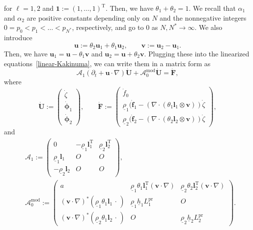 \documentclass[11pt,leqno]{article}
\numberwithin{equation}{section}
\numberwithin{figure}{section}
\begin{document}
%
for $\ell=1,2$ and $\bm{1}:=(1,\ldots,1)^\mathrm{T}$. 
Then, we have $\theta_1+\theta_2=1$.
We recall that $\alpha_1$ and $\alpha_2$ are positive constants depending only on $N$ and the nonnegative integers $0=p_0<p_1<\ldots<p_{N^*}$, respectively, 
and go to $0$ as $N,N^*\to\infty$. 
We also introduce 
%
\[
\bm{u} := \theta_2\bm{u}_1+\theta_1\bm{u}_2, \qquad \bm{v}:=\bm{u}_2-\bm{u}_1.
\]
%
Then, we have $\bm{u}_1=\bm{u}-\theta_1\bm{v}$ and $\bm{u}_2=\bm{u}+\theta_2\bm{v}$. 
Plugging these into the linearized equations~\eqref{linear-Kakinuma}, 
we can write them in a matrix form as 
%
\begin{equation}\label{Kakinuma-MF}
\mathscr{A}_1(\partial_t+\bm{u}\cdot\nabla)\dot{\bm{U}} + \mathscr{A}_0^\mathrm{mod}\dot{\bm{U}} = \dot{\bm{F}},
\end{equation}
%
where 
%
\[
\dot{\bm{U}} := \begin{pmatrix} \dot{\zeta} \\ \dot{\bm{\phi}}_1 \\ \dot{\bm{\phi}}_2 \end{pmatrix}, \qquad
\dot{\bm{F}} := \begin{pmatrix} \dot{f}_0 \\
 \underline{\rho}_1(\dot{\bm{f}}_1-(\nabla\cdot(\theta_1\bm{l}_1\otimes\bm{v}))\dot{\zeta} \\
 \underline{\rho}_2(\dot{\bm{f}}_2-(\nabla\cdot(\theta_2\bm{l}_2\otimes\bm{v}))\dot{\zeta} \end{pmatrix}, 
\]
%
and 
%
\begin{align*}
& \mathscr{A}_1 := 
\begin{pmatrix}
 0 & -\underline{\rho}_1\bm{l}_1^\mathrm{T} & \underline{\rho}_2\bm{l}_2^\mathrm{T} \\
 \underline{\rho}_1\bm{l}_1 & O & O \\
 -\underline{\rho}_2\bm{l}_2 & O & O
\end{pmatrix}, \\
& \mathscr{A}_0^\mathrm{mod} := 
\begin{pmatrix}
 a & \underline{\rho}_1\theta_1\bm{l}_1^\mathrm{T}(\bm{v}\cdot\nabla) 
  & \underline{\rho}_2\theta_2\bm{l}_2^\mathrm{T}(\bm{v}\cdot\nabla) \\
 (\bm{v}\cdot\nabla)^*(\underline{\rho}_1\theta_1\bm{l}_1\,\cdot\,) 
  & \underline{\rho}_1\underline{h}_1L_1^\mathrm{pr} & O \\
 (\bm{v}\cdot\nabla)^*(\underline{\rho}_2\theta_1\bm{l}_2\,\cdot\,) 
  & O & \underline{\rho}_2\underline{h}_2L_2^\mathrm{pr}
\end{pmatrix}.
\end{align*}
\end{document}
